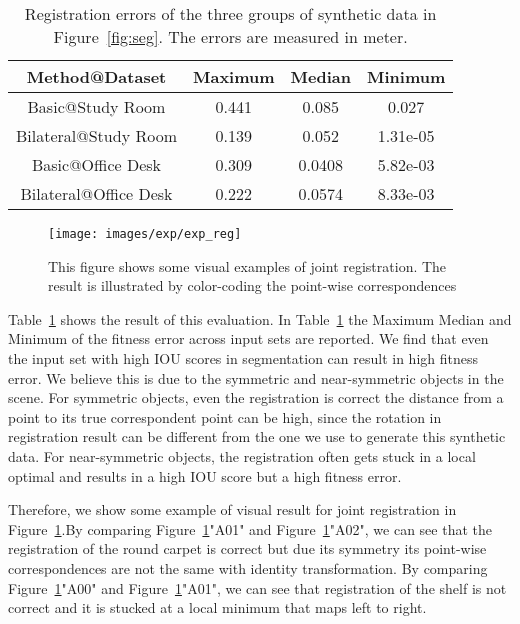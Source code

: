 \begin{table}
	\centering
	\caption{Registration errors of the three groups of synthetic data in Figure~\ref{fig:seg}. The errors are measured in meter.}
	\begin{tabular}{c | c c c}
		Method@Dataset&Maximum&Median&Minimum\\
		\hline 
		Basic@Study Room&0.441&0.085&0.027\\
		Bilateral@Study Room&0.139&0.052&1.31e-05\\
	    Basic@Office Desk&0.309&0.0408&5.82e-03\\
		Bilateral@Office Desk&0.222&0.0574&8.33e-03\\
	\end{tabular}
	\label{tab:regerror}
\end{table}
\begin{figure}[htb]
	\centering
	\texttt{[image: images/exp/exp\_reg]}
	\caption{This figure shows some visual examples of joint registration.  The result  is illustrated by color-coding the point-wise correspondences }
	\label{fig:reg_colorcode}
\end{figure}
Table~\ref{tab:regerror} shows the result of this evaluation. In Table~\ref{tab:regerror} the Maximum Median and Minimum of the fitness error across input sets are reported.
%
We find that even the input set with high IOU scores in segmentation can result in high fitness error. We believe this is due to the symmetric and near-symmetric objects in the scene. For symmetric objects, even the registration is correct the distance from a point to its true correspondent point can be high, since the rotation in registration result can be different from the one we use to generate this synthetic data. For near-symmetric objects, the registration often gets stuck in a local optimal and results in a high IOU score but a high fitness error. 

Therefore, we show some example of visual result for joint registration in Figure~\ref{fig:reg_colorcode}.By comparing Figure~\ref{fig:reg_colorcode}"A01" and Figure~\ref{fig:reg_colorcode}"A02", we can see that the registration of the round carpet is correct but due its symmetry its point-wise correspondences are not the same with identity transformation.
By comparing Figure~\ref{fig:reg_colorcode}"A00" and Figure~\ref{fig:reg_colorcode}"A01", we can see that registration of the shelf is not correct and it is stucked at a local minimum that maps left to right.

